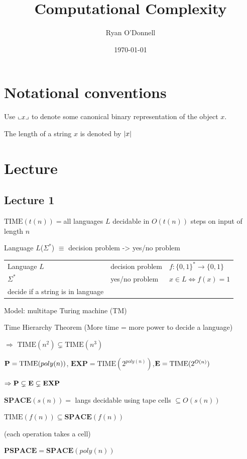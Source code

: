 \documentclass[11pt]{article}
\author{Ryan O'Donnell}
\date{\today}
\title{Computational Complexity}
\def \TIME {\text{TIME}}
\def \EXP {\textbf{EXP}}
\def \SPACE {\textbf{SPACE}}
\def \PSPACE {\textbf{PSPACE}}
\begin{document}
\maketitle
\tableofcontents

\section{Notational conventions}
\label{sec:org940b7f8}
Use \(\llcorner x \lrcorner\) to denote some canonical binary representation of the object \(x\).

The length of a string \(x\) is denoted by \(\abs{x}\)
\section{Lecture}
\label{sec:org53595bb}
\subsection{Lecture 1}
\label{sec:org9395688}
\(\TIME(t(n))=\)all languages \(L\) decidable in \(O(t(n))\) steps on input of length \(n\)

Language \(L\)(\(\Sigma^*\)) \(\equiv\) decision problem -> yes/no problem

\begin{center}
\begin{tabular}{lll}
Language \(L\) & decision problem & \(f:\{0,1\}^*\to\{0,1\}\)\\
\(\Sigma^*\) & yes/no problem & \(x\in L\Leftrightarrow f(x)=1\)\\
decide if a string is in language &  & \\
\end{tabular}
\end{center}

Model: multitape Turing machine (TM)

Time Hierarchy Theorem (More time = more power to decide a language)

\(\Rightarrow\) \(\TIME(n^2)\subsetneq\TIME(n^3)\)

\(\bP=\TIME(poly(n))\), \(\EXP=\TIME(2^{poly(n)})\),\(\bE=\TIME(2^{O(n)})\)

\(\Rightarrow\bP\subsetneq\bE\subsetneq\EXP\)

\(\SPACE(s(n))=\) langs decidable using tape cells \(\subseteq O(s(n))\)

\(\TIME(f(n))\subseteq\SPACE(f(n))\)

(each operation takes a cell)

\(\PSPACE=\SPACE(poly(n))\)
\end{document}
